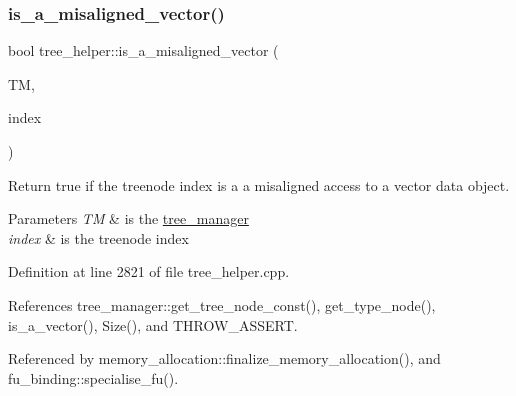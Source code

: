 \subsubsection{\texorpdfstring{is\+\_\+a\+\_\+misaligned\+\_\+vector()}{is\_a\_misaligned\_vector()}}
{\footnotesize\ttfamily bool tree\+\_\+helper\+::is\+\_\+a\+\_\+misaligned\+\_\+vector (\begin{DoxyParamCaption}\item[{const \hyperlink{tree__manager_8hpp_a792e3f1f892d7d997a8d8a4a12e39346}{tree\+\_\+manager\+Const\+Ref} \&}]{TM,  }\item[{const unsigned int}]{index }\end{DoxyParamCaption})\hspace{0.3cm}{\ttfamily [static]}}



Return true if the treenode index is a a misaligned access to a vector data object. 


\begin{DoxyParams}{Parameters}
{\em TM} & is the \hyperlink{classtree__manager}{tree\+\_\+manager} \\
\hline
{\em index} & is the treenode index \\
\hline
\end{DoxyParams}


Definition at line 2821 of file tree\+\_\+helper.\+cpp.



References tree\+\_\+manager\+::get\+\_\+tree\+\_\+node\+\_\+const(), get\+\_\+type\+\_\+node(), is\+\_\+a\+\_\+vector(), Size(), and T\+H\+R\+O\+W\+\_\+\+A\+S\+S\+E\+RT.



Referenced by memory\+\_\+allocation\+::finalize\+\_\+memory\+\_\+allocation(), and fu\+\_\+binding\+::specialise\+\_\+fu().

